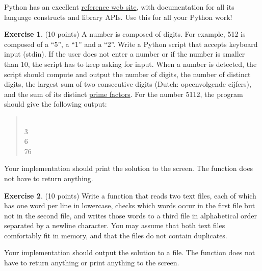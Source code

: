 \documentclass[a4paper]{report}
\theoremstyle{definition}
\newtheorem{exercise}{Exercise}
\begin{document}
\noindent Python has an excellent \href{https://docs.python.org/3/}{reference web site}, with documentation for all its language
constructs and library APIs. Use this for all your Python work!

\begin{exercise}
	(10 points) A number is composed of digits. For example, 512 is composed of a “5”, a “1” and  a “2”. Write a Python script that accepts keyboard input (stdin). If the user does not enter a number or if the number is smaller than 10, the script has to keep asking for input. When a number is detected, the script should compute and output the number of digits, the number of distinct digits, the largest sum of two consecutive digits  (Dutch: opeenvolgende cijfers), and the sum of its distinct \href{https://en.wikipedia.org/wiki/Prime_factor}{prime factors}. For the number 5112, the program should give the following output:
	
	\begin{quote}{\ttfamily \raggedright {}\\
			3\\
			6\\
			76
		}
	\end{quote}

	\noindent Your implementation should print the solution to the screen. The function does not have to return anything.
\end{exercise}

\begin{exercise}
	(10 points) Write a function that reads two text files, each of which has one word per line in lowercase, checks which words occur in
	the first file but not in the second file, and writes those words to a third file in alphabetical order separated by a newline character. You	may assume that both text files comfortably fit in memory, and that the	files do not contain duplicates.
	
	Your implementation should output the solution to a file. The function does not have to return anything or print anything to the screen.	
\end{exercise}
\end{document}
